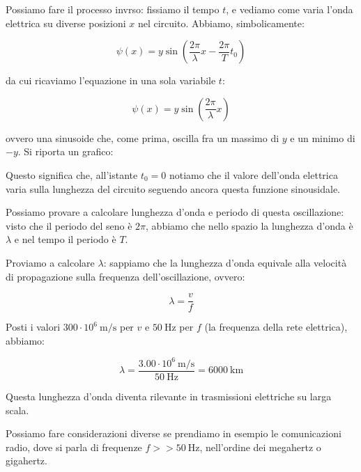 \documentclass[a4paper,14pt]{memoir}
\begin{document}
Possiamo fare il processo invrso: fissiamo il tempo $t$, e vediamo come varia l'onda elettrica su diverse posizioni $x$ nel circuito.
Abbiamo, simbolicamente:

$$
	\psi(x) = y \sin{\left( \frac{2\pi}{\lambda}x - \frac{2\pi}{T} t_0 \right)}
$$

da cui ricaviamo l'equazione in una sola variabile $t$:

$$
	\psi(x) = y \sin{\left( \frac{2\pi}{\lambda}x \right)}
$$

ovvero una sinusoide che, come prima, oscilla fra un massimo di $y$ e un minimo di $-y$.
Si riporta un grafico:

\begin{center}
\end{center}

Questo significa che, all'istante $t_0 = 0$ notiamo che il valore dell'onda elettrica varia sulla lunghezza del circuito seguendo ancora questa funzione sinousidale.

Possiamo provare a calcolare lunghezza d'onda e periodo di questa oscillazione: visto che il periodo del seno è $2\pi$, abbiamo che nello spazio la lunghezza d'onda è $\lambda$ e nel tempo il periodo è $T$.

Proviamo a calcolare $\lambda$: sappiamo che la lunghezza d'onda equivale alla velocità di propagazione sulla frequenza dell'oscillazione, ovvero:

$$
\lambda = \frac{v}{f}
$$

Posti i valori $300 \cdot 10^6 \ \mathrm{m/s}$ per $v$ e $50 \ \text{Hz}$ per $f$ (la frequenza della rete elettrica), abbiamo:

$$
\lambda = \frac{3.00 \cdot 10^6 \ \mathrm{m/s}}{50 \ \text{Hz}} = 6000 \ \text{km} 
$$

Questa lunghezza d'onda diventa rilevante in trasmissioni elettriche su larga scala.

Possiamo fare considerazioni diverse se prendiamo in esempio le comunicazioni radio, dove si parla di frequenze $f >> 50 \ \text{Hz}$, nell'ordine dei megahertz o gigahertz.
\end{document}

